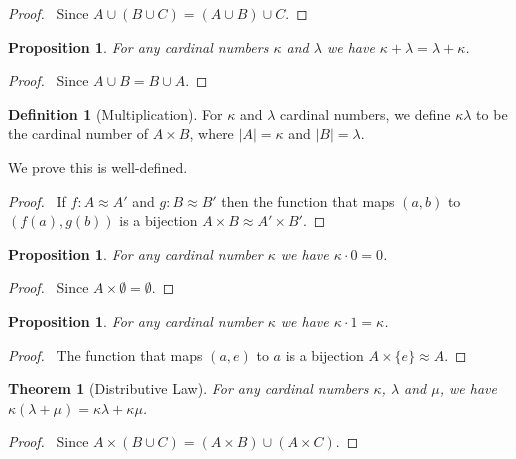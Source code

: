 \documentclass{book}
\let\qed\relax
\newtheorem{prop}[ax]{Proposition}
\newtheorem{thm}[ax]{Theorem}
\theoremstyle{definition}
\newtheorem{df}[ax]{Definition}
\begin{document}
\begin{proof}
\pf\ Since $A \cup (B \cup C) = (A \cup B) \cup C$. \qed
\end{proof}

\begin{prop}
For any cardinal numbers $\kappa$ and $\lambda$ we have $\kappa + \lambda = \lambda + \kappa$.
\end{prop}

\begin{proof}
\pf\ Since $A \cup B = B \cup A$. \qed
\end{proof}

\begin{df}[Multiplication]
For $\kappa$ and $\lambda$ cardinal numbers, we define $\kappa \lambda$ to be the cardinal number of $A \times B$, where $|A| = \kappa$ and $|B| = \lambda$.

We prove this is well-defined.
\end{df}

\begin{proof}
\pf\ If $f : A \approx A'$ and $g : B \approx B'$ then the function that maps $(a,b)$ to $(f(a),g(b))$ is a bijection $A \times B \approx A' \times B'$. \qed
\end{proof}

\begin{prop}
For any cardinal number $\kappa$ we have $\kappa \cdot 0 = 0$.
\end{prop}

\begin{proof}
\pf\ Since $A \times \emptyset = \emptyset$. \qed
\end{proof}

\begin{prop}
\label{prop:multone}
For any cardinal number $\kappa$ we have $\kappa \cdot 1 = \kappa$.
\end{prop}

\begin{proof}
\pf\ The function that maps $(a,e)$ to $a$ is a bijection $A \times \{e\} \approx A$. \qed
\end{proof}

\begin{thm}[Distributive Law]
For any cardinal numbers $\kappa$, $\lambda$ and $\mu$, we have $\kappa(\lambda + \mu) = \kappa \lambda + \kappa \mu$.
\end{thm}

\begin{proof}
\pf\ Since $A \times (B \cup C) = (A \times B) \cup (A \times C)$. \qed
\end{proof}
\end{document}
